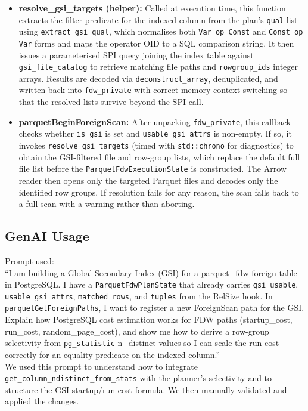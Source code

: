 \documentclass[11pt, a4paper]{article}
\begin{document}
\begin{itemize}
\item \textbf{resolve\_gsi\_targets (helper):} Called at execution time, this function extracts the filter predicate for the indexed column from the plan's \texttt{qual} list using \texttt{extract\_gsi\_qual}, which normalises both \texttt{Var op Const} and \texttt{Const op Var} forms and maps the operator OID to a SQL comparison string. It then issues a parameterised SPI query joining the index table against \texttt{gsi\_file\_catalog} to retrieve matching file paths and \texttt{rowgroup\_ids} integer arrays. Results are decoded via \texttt{deconstruct\_array}, deduplicated, and written back into \texttt{fdw\_private} with correct memory-context switching so that the resolved lists survive beyond the SPI call.

\item \textbf{parquetBeginForeignScan:} After unpacking \texttt{fdw\_private}, this callback checks whether \texttt{is\_gsi} is set and \texttt{usable\_gsi\_attrs} is non-empty. If so, it invokes \texttt{resolve\_gsi\_targets} (timed with \texttt{std::chrono} for diagnostics) to obtain the GSI-filtered file and row-group lists, which replace the default full file list before the \texttt{ParquetFdwExecutionState} is constructed. The Arrow reader then opens only the targeted Parquet files and decodes only the identified row groups. If resolution fails for any reason, the scan falls back to a full scan with a warning rather than aborting.

\end{itemize}

\subsection{GenAI Usage}
Prompt used:
\\
``I am building a Global Secondary Index (GSI) for a parquet\_fdw foreign table in PostgreSQL. I have a \texttt{ParquetFdwPlanState} that already carries \texttt{gsi\_usable}, \texttt{usable\_gsi\_attrs}, \texttt{matched\_rows}, and \texttt{tuples} from the RelSize hook. In \texttt{parquetGetForeignPaths}, I want to register a new ForeignScan path for the GSI. Explain how PostgreSQL cost estimation works for FDW paths (startup\_cost, run\_cost, random\_page\_cost), and show me how to derive a row-group selectivity from \texttt{pg\_statistic} n\_distinct values so I can scale the run cost correctly for an equality predicate on the indexed column.''
\\
We used this prompt to understand how to integrate \texttt{get\_column\_ndistinct\_from\_stats} with the planner's selectivity and to structure the GSI startup/run cost formula. We then manually validated and applied the changes.
\end{document}

